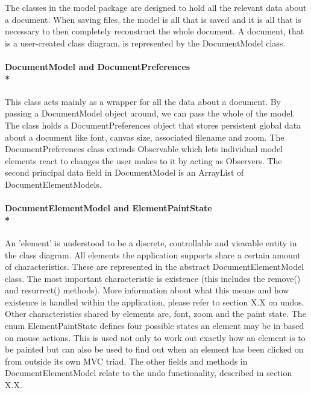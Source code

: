 	
\tab The classes in the model package are designed to hold all the relevant data about a document. When saving files, the model is all that is saved and it is all that is necessary to then completely reconstruct the whole document. A document, that is a user-created class diagram, is represented by the DocumentModel class. 

\paragraph{\small{\tab DocumentModel and DocumentPreferences\\*}}

\hspace{-10pt}This class acts mainly as a wrapper for all the data about a document. By passing a DocumentModel object around, we can pass the whole of the model.  The class holds a DocumentPreferences object that stores persistent global data about a document like font, canvas size, associated filename and zoom. The DocumentPreferences class extends Observable which lets individual model elements react to changes the user makes to it by acting as Observers. The second principal data field in DocumentModel is an ArrayList of DocumentElementModels.

\paragraph{\small{\tab DocumentElementModel and ElementPaintState\\*}}

\hspace{-10pt}An 'element' is understood to be a discrete, controllable and viewable entity in the class diagram. All elements the application supports share a certain amount of characteristics. These are represented in the abstract DocumentElementModel class. The most important characteristic is existence (this includes the remove() and resurrect() methods). More information about what this means and how existence is handled within the application, please refer to section X.X on undos. Other characteristics shared by elements are, font, zoom and the paint state. The enum ElementPaintState defines four possible states an element may be in based on mouse actions. This is used not only to work out exactly how an element is to be painted but can also be used to find out when an element has been clicked on from outside its own MVC triad. The other fields and methods in DocumentElementModel relate to the undo functionality, described in section X.X.

